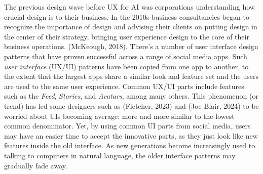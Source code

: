 \documentclass[
  letterpaper,
  DIV=11,
  numbers=noendperiod]{scrartcl}
\begin{document}
The previous design wave before UX for AI was corporations understanding
how crucial design is to their business. In the 2010s business
consultancies began to recognize the importance of design and advising
their clients on putting design in the center of their strategy,
bringing user experience design to the core of their business
operations. (McKeough, 2018). There's a number of user interface design
patterns that have proven successful across a range of social media
apps. Such \emph{user interface} (UX/UI) patterns have been copied from
one app to another, to the extent that the largest apps share a similar
look and feature set and the users are used to the same user experience.
Common UX/UI parts include features such as the \emph{Feed},
\emph{Stories}, and \emph{Avatars}, among many others. This phenomenon
(or trend) has led some designers such as (Fletcher, 2023) and (Joe
Blair, 2024) to be worried about UIs becoming average: more and more
similar to the lowest common denominator. Yet, by using common UI parts
from social media, users may have an easier time to accept the
innovative parts, as they just look like new features inside the old
interface. As new generations become increasingly used to talking to
computers in natural language, the older interface patterns may
gradually fade away.
\end{document}
